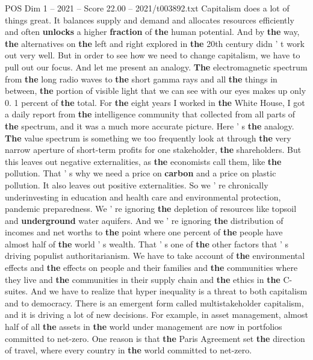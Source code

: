 \begin{textsample}{POS Dim 1 – 2021 – Score 22.00 – 2021/t003892.txt}
Capitalism does a lot of things great.
It balances supply and demand and allocates resources efficiently and often \textbf{unlocks} a higher \textbf{fraction} of \textbf{the} human potential.
And by \textbf{the} way, \textbf{the} alternatives on \textbf{the} left and right explored in \textbf{the} 20th century didn ' t work out very well.
But in order to see how we need to change capitalism, we have to pull out our focus.
And let me present an analogy. \textbf{The} electromagnetic spectrum from \textbf{the} long radio waves to \textbf{the} short gamma rays and all \textbf{the} things in between, \textbf{the} portion of visible light that we can see with our eyes makes up only 0. 1 percent of \textbf{the} total.
For \textbf{the} eight years I worked in \textbf{the} White House, I got a daily report from \textbf{the} intelligence community that collected from all parts of \textbf{the} spectrum, and it was a much more accurate picture.
Here ' s \textbf{the} analogy. \textbf{The} value spectrum is something we too frequently look at through \textbf{the} very narrow aperture of short-term profits for one stakeholder, \textbf{the} shareholders.
But this leaves out negative externalities, as \textbf{the} economists call them, like \textbf{the} pollution.
That ' s why we need a price on \textbf{carbon} and a price on plastic pollution.
It also leaves out positive externalities.
So we ' re chronically underinvesting in education and health care and environmental protection, pandemic preparedness.
We ' re ignoring \textbf{the} depletion of resources like topsoil and \textbf{underground} water aquifers.
And we ' re ignoring \textbf{the} distribution of incomes and net worths to \textbf{the} point where one percent of \textbf{the} people have almost half of \textbf{the} world ' s wealth.
That ' s one of \textbf{the} other factors that ' s driving populist authoritarianism.
We have to take account of \textbf{the} environmental effects and \textbf{the} effects on people and their families and \textbf{the} communities where they live and \textbf{the} communities in their supply chain and \textbf{the} ethics in \textbf{the} C-suites.
And we have to realize that hyper inequality is a threat to both capitalism and to democracy.
There is an emergent form called multistakeholder capitalism, and it is driving a lot of new decisions.
For example, in asset management, almost half of all \textbf{the} assets in \textbf{the} world under management are now in portfolios committed to net-zero.
One reason is that \textbf{the} Paris Agreement set \textbf{the} direction of travel, where every country in \textbf{the} world committed to net-zero.

\end{textsample}
